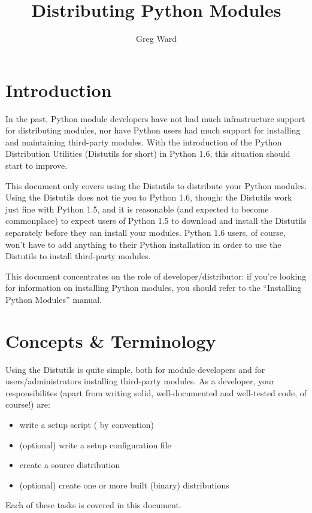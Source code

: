 \documentclass{howto}
\title{Distributing Python Modules}
\author{Greg Ward}
\begin{document}
\maketitle
\tableofcontents

\section{Introduction}
\label{sec:intro}

In the past, Python module developers have not had much infrastructure
support for distributing modules, nor have Python users had much support
for installing and maintaining third-party modules.  With the
introduction of the Python Distribution Utilities (Distutils for short)
in Python 1.6, this situation should start to improve.

This document only covers using the Distutils to distribute your Python
modules.  Using the Distutils does not tie you to Python 1.6, though:
the Distutils work just fine with Python 1.5, and it is reasonable (and
expected to become commonplace) to expect users of Python 1.5 to
download and install the Distutils separately before they can install
your modules.  Python 1.6 users, of course, won't have to add anything
to their Python installation in order to use the Distutils to install
third-party modules.

This document concentrates on the role of developer/distributor: if
you're looking for information on installing Python modules, you should
refer to the ``Installing Python Modules'' manual.


\section{Concepts \& Terminology}
\label{sec:concepts}

Using the Distutils is quite simple, both for module developers and for
users/administrators installing third-party modules.  As a developer,
your responsibilites (apart from writing solid, well-documented and
well-tested code, of course!) are:
\begin{itemize}
\item write a setup script ( by convention)
\item (optional) write a setup configuration file
\item create a source distribution
\item (optional) create one or more built (binary) distributions
\end{itemize}
Each of these tasks is covered in this document.
\end{document}
